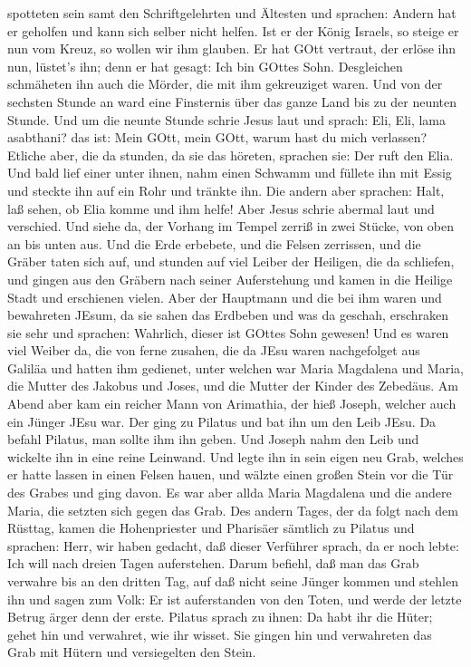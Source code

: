 spotteten sein samt den Schriftgelehrten und Ältesten und sprachen:
 Andern hat er geholfen und kann sich selber nicht helfen.
Ist er der König Israels, so steige er nun vom Kreuz, so wollen wir ihm
glauben.  Er hat GOtt vertraut, der erlöse ihn nun,
lüstet's ihn; denn er hat gesagt: Ich bin GOttes Sohn. 
Desgleichen schmäheten ihn auch die Mörder, die mit ihm gekreuziget
waren.  Und von der sechsten Stunde an ward eine Finsternis
über das ganze Land bis zu der neunten Stunde.  Und um die
neunte Stunde schrie Jesus laut und sprach: Eli, Eli, lama asabthani?
das ist: Mein GOtt, mein GOtt, warum hast du mich verlassen?
 Etliche aber, die da stunden, da sie das höreten, sprachen
sie: Der ruft den Elia.  Und bald lief einer unter ihnen,
nahm einen Schwamm und füllete ihn mit Essig und steckte ihn auf ein
Rohr und tränkte ihn.  Die andern aber sprachen: Halt, laß
sehen, ob Elia komme und ihm helfe!  Aber Jesus schrie
abermal laut und verschied.  Und siehe da, der Vorhang im
Tempel zerriß in zwei Stücke, von oben an bis unten aus. 
Und die Erde erbebete, und die Felsen zerrissen, und die Gräber taten
sich auf, und stunden auf viel Leiber der Heiligen, die da schliefen,
 und gingen aus den Gräbern nach seiner Auferstehung und
kamen in die Heilige Stadt und erschienen vielen.  Aber der
Hauptmann und die bei ihm waren und bewahreten JEsum, da sie sahen das
Erdbeben und was da geschah, erschraken sie sehr und sprachen: Wahrlich,
dieser ist GOttes Sohn gewesen!  Und es waren viel Weiber
da, die von ferne zusahen, die da JEsu waren nachgefolget aus Galiläa
und hatten ihm gedienet,  unter welchen war Maria Magdalena
und Maria, die Mutter des Jakobus und Joses, und die Mutter der Kinder
des Zebedäus.  Am Abend aber kam ein reicher Mann von
Arimathia, der hieß Joseph, welcher auch ein Jünger JEsu war.
 Der ging zu Pilatus und bat ihn um den Leib JEsu. Da
befahl Pilatus, man sollte ihm ihn geben.  Und Joseph nahm
den Leib und wickelte ihn in eine reine Leinwand.  Und
legte ihn in sein eigen neu Grab, welches er hatte lassen in einen
Felsen hauen, und wälzte einen großen Stein vor die Tür des Grabes und
ging davon.  Es war aber allda Maria Magdalena und die
andere Maria, die setzten sich gegen das Grab.  Des andern
Tages, der da folgt nach dem Rüsttag, kamen die Hohenpriester und
Pharisäer sämtlich zu Pilatus  und sprachen: Herr, wir
haben gedacht, daß dieser Verführer sprach, da er noch lebte: Ich will
nach dreien Tagen auferstehen.  Darum befiehl, daß man das
Grab verwahre bis an den dritten Tag, auf daß nicht seine Jünger kommen
und stehlen ihn und sagen zum Volk: Er ist auferstanden von den Toten,
und werde der letzte Betrug ärger denn der erste.  Pilatus
sprach zu ihnen: Da habt ihr die Hüter; gehet hin und verwahret, wie ihr
wisset.  Sie gingen hin und verwahreten das Grab mit Hütern
und versiegelten den Stein.


